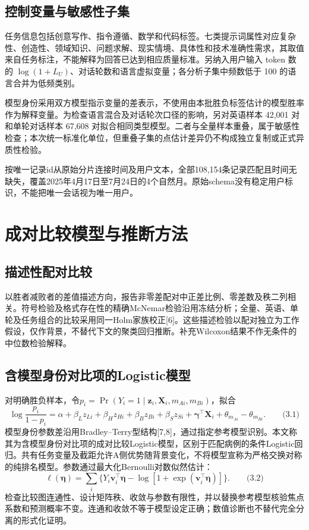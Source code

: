 \documentclass[UTF8,11pt,a4paper,fontset=windows]{ctexart}
\numberwithin{equation}{section}
\begin{document}
\subsection{控制变量与敏感性子集}
任务信息包括创意写作、指令遵循、数学和代码标签。七类提示词属性对应复杂性、创造性、领域知识、问题求解、现实情境、具体性和技术准确性需求，其取值来自任务标注，不能解释为回答已达到相应质量标准。另纳入用户输入 token 数的 $\log(1+L_U)$、对话轮数和语言虚拟变量；各分析子集中频数低于 100 的语言合并为低频类别。

模型身份采用双方模型指示变量的差表示，不使用由本批胜负标签估计的模型胜率作为解释变量。为检查语言混合及对话轮次口径的影响，另对英语样本 42,001 对和单轮对话样本 67,608 对拟合相同类型模型。二者与全量样本重叠，属于敏感性检查；本次统一标准化单位，但重叠子集的点估计差异仍不构成独立复制或正式异质性检验。


按唯一记录id从原始分片连接时间及用户文本，全部108,154条记录匹配且时间无缺失，覆盖2025年4月17日至7月24日的4个自然月。原始schema没有稳定用户标识，不能把唯一会话视为唯一用户。

\section{成对比较模型与推断方法}
\subsection{描述性配对比较}
以胜者减败者的差值描述方向，报告非零差配对中正差比例、零差数及秩二列相关。符号检验及格式存在性的精确McNemar检验沿用冻结分析；全量、英语、单轮及任务组合的比较采用同一Holm家族校正[6]。这些描述检验以配对独立为工作假设，仅作背景，不替代下文的聚类回归推断。补充Wilcoxon结果不作无条件的中位数检验解释。

\subsection{含模型身份对比项的Logistic模型}
对明确胜负样本，令$p_i=\Pr(Y_i=1\mid\bm z_i,\bm X_i,m_{Ai},m_{Bi})$，拟合
\[\log\frac{p_i}{1-p_i}=\alpha+\beta_Lz_{Li}+\beta_Hz_{Hi}
 +\beta_Bz_{Bi}+\beta_Sz_{Si}+\bm\gamma^\top\bm X_i
 +\theta_{m_{Ai}}-\theta_{m_{Bi}}.\qquad\text{(3.1)}\]
模型身份参数差沿用Bradley--Terry型结构[7,8]，通过指定参考模型识别。本文称其为含模型身份对比项的成对比较Logistic模型，区别于匹配病例的条件Logistic回归。共有任务变量及截距允许A侧优势随背景变化，不将模型宣称为严格交换对称的纯排名模型。参数通过最大化Bernoulli对数似然估计：
\[\ell(\bm\eta)=\sum_i\{Y_i\bm v_i^\top\bm\eta-\log[1+\exp(\bm v_i^\top\bm\eta)]\}.\qquad\text{(3.2)}\]
检查比较图连通性、设计矩阵秩、收敛与参数有限性，并以替换参考模型核验焦点系数和预测概率不变。连通和收敛不等于模型设定正确；数值诊断也不替代完全分离的形式化证明。
\end{document}
